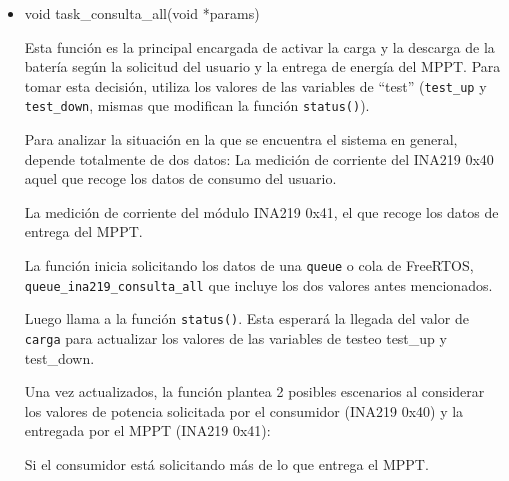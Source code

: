                 \begin{itemize} [label = ·]
                \setlength{\itemindent}{1.5em}
                
                    \item void task\_consulta\_all(void *params)\par
                    
                    Esta función es la principal encargada de activar la carga y la descarga de la batería según la solicitud del usuario y la entrega de energía del MPPT. Para tomar esta decisión, utiliza los valores de las variables de “test” (\texttt{test\_up} y \texttt{test\_down}, mismas que modifican la función \texttt{status()}).\par
                    Para analizar la situación en la que se encuentra el sistema en general, depende totalmente de dos datos:
                    La medición de corriente del INA219 0x40 aquel que recoge los datos de consumo del usuario.\par
                    La medición de corriente del módulo INA219 0x41, el que recoge los datos de entrega del MPPT.\par
                    La función inicia solicitando los datos de una \texttt{queue} o cola de FreeRTOS, \texttt{queue\_ina219\_consulta\_all} que incluye los dos valores antes mencionados.\par
                    
                    \par
                    
                    Luego llama a la función \texttt{status()}. Esta esperará la llegada del valor de \texttt{carga} para actualizar los valores de las variables de testeo test\_up y test\_down.\par
                    Una vez actualizados, la función plantea 2 posibles escenarios al considerar los valores de potencia solicitada por el consumidor (INA219 0x40) y la entregada por el MPPT (INA219 0x41):\par
                    Si el consumidor está solicitando más de lo que entrega el MPPT.\par
                    
                    \par
                    

\end{itemize}
